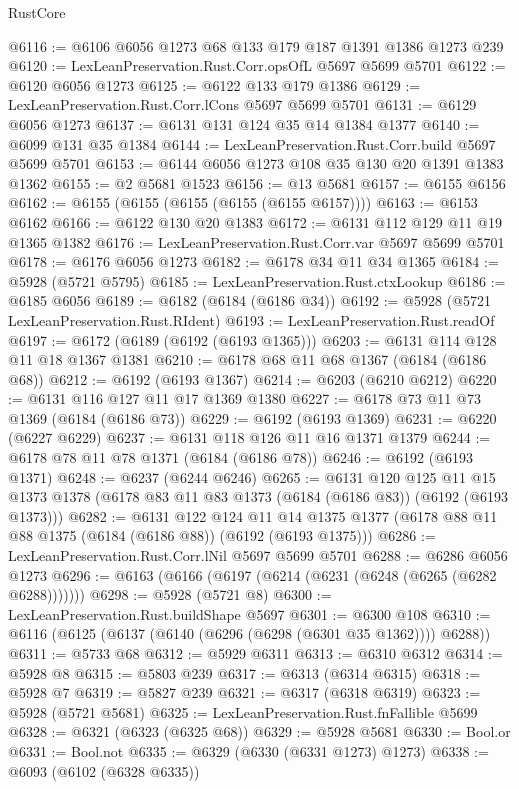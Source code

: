 \begin{lexlean}{RustCore}
\begin{coremodule}
{\begin{coremodule}
{{{{{{{{{{{{{{{{{{{{{{{{{{{{{{{{{{{{{{{{{{{{@6116 := @6106 @6056 @1273 @68 @133 @179 @187 @1391 @1386 @1273 @239
@6120 := LexLeanPreservation.Rust.Corr.opsOfL @5697 @5699 @5701
@6122 := @6120 @6056 @1273
@6125 := @6122 @133 @179 @1386
@6129 := LexLeanPreservation.Rust.Corr.lCons @5697 @5699 @5701
@6131 := @6129 @6056 @1273
@6137 := @6131 @131 @124 @35 @14 @1384 @1377
@6140 := @6099 @131 @35 @1384
@6144 := LexLeanPreservation.Rust.Corr.build @5697 @5699 @5701
@6153 := @6144 @6056 @1273 @108 @35 @130 @20 @1391 @1383 @1362
@6155 := @2 @5681 @1523
@6156 := @13 @5681
@6157 := @6155 @6156
@6162 := @6155 (@6155 (@6155 (@6155 (@6155 @6157))))
@6163 := @6153 @6162
@6166 := @6122 @130 @20 @1383
@6172 := @6131 @112 @129 @11 @19 @1365 @1382
@6176 := LexLeanPreservation.Rust.Corr.var @5697 @5699 @5701
@6178 := @6176 @6056 @1273
@6182 := @6178 @34 @11 @34 @1365
@6184 := @5928 (@5721 @5795)
@6185 := LexLeanPreservation.Rust.ctxLookup
@6186 := @6185 @6056
@6189 := @6182 (@6184 (@6186 @34))
@6192 := @5928 (@5721 LexLeanPreservation.Rust.RIdent)
@6193 := LexLeanPreservation.Rust.readOf
@6197 := @6172 (@6189 (@6192 (@6193 @1365)))
@6203 := @6131 @114 @128 @11 @18 @1367 @1381
@6210 := @6178 @68 @11 @68 @1367 (@6184 (@6186 @68))
@6212 := @6192 (@6193 @1367)
@6214 := @6203 (@6210 @6212)
@6220 := @6131 @116 @127 @11 @17 @1369 @1380
@6227 := @6178 @73 @11 @73 @1369 (@6184 (@6186 @73))
@6229 := @6192 (@6193 @1369)
@6231 := @6220 (@6227 @6229)
@6237 := @6131 @118 @126 @11 @16 @1371 @1379
@6244 := @6178 @78 @11 @78 @1371 (@6184 (@6186 @78))
@6246 := @6192 (@6193 @1371)
@6248 := @6237 (@6244 @6246)
@6265 := @6131
    @120
    @125
    @11
    @15
    @1373
    @1378
    (@6178 @83 @11 @83 @1373 (@6184 (@6186 @83)) (@6192 (@6193 @1373)))
@6282 := @6131
    @122
    @124
    @11
    @14
    @1375
    @1377
    (@6178 @88 @11 @88 @1375 (@6184 (@6186 @88)) (@6192 (@6193 @1375)))
@6286 := LexLeanPreservation.Rust.Corr.lNil @5697 @5699 @5701
@6288 := @6286 @6056 @1273
@6296 := @6163 (@6166 (@6197 (@6214 (@6231 (@6248 (@6265 (@6282 @6288)))))))
@6298 := @5928 (@5721 @8)
@6300 := LexLeanPreservation.Rust.buildShape @5697
@6301 := @6300 @108
@6310 := @6116 (@6125 (@6137 (@6140 (@6296 (@6298 (@6301 @35 @1362)))) @6288))
@6311 := @5733 @68
@6312 := @5929 @6311
@6313 := @6310 @6312
@6314 := @5928 @8
@6315 := @5803 @239
@6317 := @6313 (@6314 @6315)
@6318 := @5928 @7
@6319 := @5827 @239
@6321 := @6317 (@6318 @6319)
@6323 := @5928 (@5721 @5681)
@6325 := LexLeanPreservation.Rust.fnFallible @5699
@6328 := @6321 (@6323 (@6325 @68))
@6329 := @5928 @5681
@6330 := Bool.or
@6331 := Bool.not
@6335 := @6329 (@6330 (@6331 @1273) @1273)
@6338 := @6093 (@6102 (@6328 @6335))
}}}}}}}}}}}}}}}}}}}}}}}}}}}}}}}}}}}}}}}}}}}}
\end{coremodule}}
\end{coremodule}
\end{lexlean}
